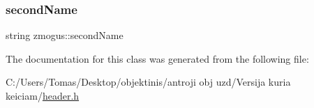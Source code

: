 \subsubsection{\texorpdfstring{secondName}{secondName}}
{\footnotesize\ttfamily string zmogus\+::second\+Name\hspace{0.3cm}{\ttfamily [protected]}}



The documentation for this class was generated from the following file\+:\begin{DoxyCompactItemize}
\item 
C\+:/\+Users/\+Tomas/\+Desktop/objektinis/antroji obj uzd/\+Versija kuria keiciam/\mbox{\hyperlink{header_8h}{header.\+h}}\end{DoxyCompactItemize}
